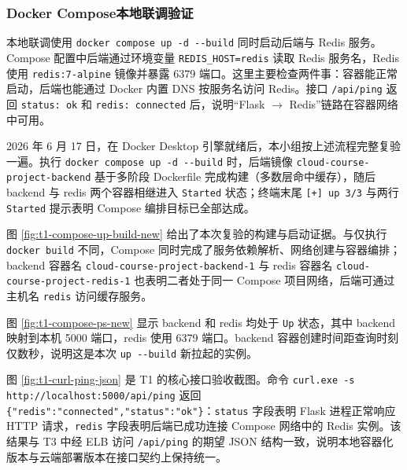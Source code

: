 \subsubsection{Docker Compose本地联调验证}

本地联调使用 \verb|docker compose up -d --build| 同时启动后端与 Redis 服务。Compose 配置中后端通过环境变量 \verb|REDIS_HOST=redis| 读取 Redis 服务名，Redis 使用 \verb|redis:7-alpine| 镜像并暴露 6379 端口。这里主要检查两件事：容器能正常启动，后端也能通过 Docker 内置 DNS 按服务名访问 Redis。接口 \verb|/api/ping| 返回 \verb|status: ok| 和 \verb|redis: connected| 后，说明“Flask $\rightarrow$ Redis”链路在容器网络中可用。

2026 年 6 月 17 日，在 Docker Desktop 引擎就绪后，本小组按上述流程完整复验一遍。执行 \verb|docker compose up -d --build| 时，后端镜像 \verb|cloud-course-project-backend| 基于多阶段 Dockerfile 完成构建（多数层命中缓存），随后 backend 与 redis 两个容器相继进入 \verb|Started| 状态；终端末尾 \verb|[+] up 3/3| 与两行 \verb|Started| 提示表明 Compose 编排目标已全部达成。


图 \ref{fig:t1-compose-up-build-new} 给出了本次复验的构建与启动证据。与仅执行 \verb|docker build| 不同，Compose 同时完成了服务依赖解析、网络创建与容器编排；backend 容器名 \verb|cloud-course-project-backend-1| 与 redis 容器名 \verb|cloud-course-project-redis-1| 也表明二者处于同一 Compose 项目网络，后端可通过主机名 \verb|redis| 访问缓存服务。


图 \ref{fig:t1-compose-ps-new} 显示 backend 和 redis 均处于 \verb|Up| 状态，其中 backend 映射到本机 5000 端口，redis 使用 6379 端口。backend 容器创建时间距查询时刻仅数秒，说明这是本次 \verb|up --build| 新拉起的实例。


图 \ref{fig:t1-curl-ping-json} 是 T1 的核心接口验收截图。命令 \verb|curl.exe -s http://localhost:5000/api/ping| 返回 \verb|{"redis":"connected","status":"ok"}|：\verb|status| 字段表明 Flask 进程正常响应 HTTP 请求，\verb|redis| 字段表明后端已成功连接 Compose 网络中的 Redis 实例。该结果与 T3 中经 ELB 访问 \verb|/api/ping| 的期望 JSON 结构一致，说明本地容器化版本与云端部署版本在接口契约上保持统一。

